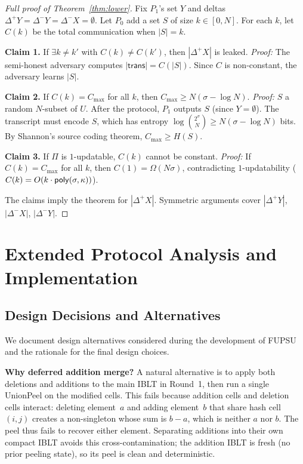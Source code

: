 \begin{proof}[Full proof of Theorem~\ref{thm:lower}]
Fix $P_1$'s set $Y$ and deltas $\Delta^+ Y = \Delta^- Y = \Delta^- X =
\emptyset$. Let $P_0$ add a set $S$ of size $k \in [0, N]$. For each $k$,
let $C(k)$ be the total communication when $|S| = k$.

\textbf{Claim 1.} If $\exists k \neq k'$ with $C(k) \neq C(k')$, then
$|\Delta^+ X|$ is leaked. \emph{Proof:} The semi-honest adversary computes
$|\mathsf{trans}| = C(|S|)$. Since $C$ is non-constant, the adversary learns
$|S|$.

\textbf{Claim 2.} If $C(k) = C_{\max}$ for all $k$, then $C_{\max} \geq
N(\sigma - \log N)$. \emph{Proof:} $S$ a random $N$-subset of $U$. After the
protocol, $P_1$ outputs $S$ (since $Y = \emptyset$). The transcript must
encode $S$, which has entropy $\log\binom{2^\sigma}{N} \geq N(\sigma - \log
N)$ bits. By Shannon's source coding theorem, $C_{\max} \geq H(S)$.

\textbf{Claim 3.} If $\Pi$ is $1$-updatable, $C(k)$ cannot be constant.
\emph{Proof:} If $C(k) = C_{\max}$ for all $k$, then $C(1) = \Omega(N\sigma)$,
contradicting $1$-updatability ($C(k) = O(k \cdot \mathsf{poly}(\sigma, \kappa))$).

The claims imply the theorem for $|\Delta^+ X|$. Symmetric arguments cover
$|\Delta^+ Y|$, $|\Delta^- X|$, $|\Delta^- Y|$.
\end{proof}

\section{Extended Protocol Analysis and Implementation}
\label{sec:ext-protocol-main}

\subsection{Design Decisions and Alternatives}

We document design alternatives considered during the development of FUPSU
and the rationale for the final design choices.

\smallskip\noindent\textbf{Why deferred addition merge?}
A natural alternative is to apply both deletions and additions to the main
IBLT in Round~1, then run a single UnionPeel on the modified cells. This
fails because addition cells and deletion cells interact: deleting element~$a$
and adding element~$b$ that share hash cell~$(i,j)$ creates a non-singleton
whose sum is $b - a$, which is neither $a$ nor $b$. The peel thus fails to
recover either element. Separating additions into their own compact IBLT
avoids this cross-contamination; the addition IBLT is fresh (no prior peeling
state), so its peel is clean and deterministic.

